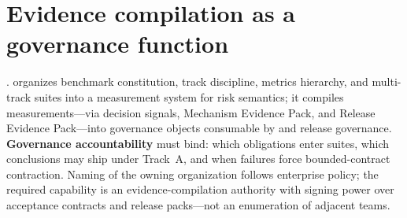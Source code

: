 \documentclass[11pt,a4paper]{report}
\begin{document}
\section{Evidence compilation as a governance function}
\EvalFramework{}. \EvalFramework{} organizes benchmark constitution, track discipline, metrics hierarchy, and multi-track suites into a measurement system for risk semantics; it compiles measurements—via decision signals, Mechanism Evidence Pack, and Release Evidence Pack—into governance objects consumable by \ControlPlane{} and release governance. \textbf{Governance accountability} must bind: which obligations enter suites, which conclusions may ship under Track~A, and when failures force bounded-contract contraction. Naming of the owning organization follows enterprise policy; the required capability is an evidence-compilation authority with signing power over acceptance contracts and release packs—not an enumeration of adjacent teams.
\end{document}
